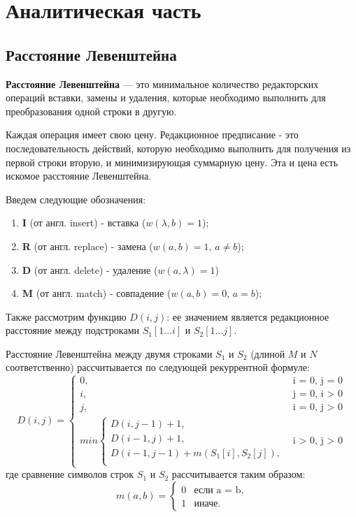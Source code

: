 \chapter{Аналитическая часть}
\section{Расстояние Левенштейна}

\textbf{Расстояние Левенштейна}\cite{levenshtein}  --- это минимальное количество редакторских операций вставки, замены и удаления, которые необходимо выполнить для преобразования одной строки в другую. 

Каждая операция имеет свою цену. Редакционное предписание - это последовательность действий, которую необходимо выполнить для получения из первой строки вторую, и минимизирующая суммарную цену. Эта  и цена есть искомое расстояние Левенштейна.

Введем следующие обозначения:
\begin{enumerate}[label=\arabic*)]
        \item \textbf{I} (от англ. insert) - вставка ($w(\lambda, b) = 1$);
        \item \textbf{R} (от англ. replace) - замена ($w(a, b) = 1$, $a \neq b$);
        \item \textbf{D} (от англ. delete) - удаление ($w(a, \lambda) = 1$)
        \item \textbf{M} (от англ. match) - совпадение ($w(a, b) = 0$, $a = b$);
\end{enumerate}

Также рассмотрим функцию $D(i, j)$: ее значением является
редакционное расстояние между подстроками $S_1[1...i]$ и $S_2[1...j]$.

Расстояние Левенштейна между двумя строками $S_{1}$ и $S_{2}$ (длиной $M$ и $N$ соответственно) рассчитывается по следующей рекуррентной формуле:
\begin{equation}
	\label{eq:L}
	D(i, j) =
	\begin{cases}
		0, &\text{i = 0, j = 0}\\
		i, &\text{j = 0, i > 0}\\
		j, &\text{i = 0, j > 0}\\
		min \begin{cases}
			D(i, j - 1) + 1,\\
			D(i - 1, j) + 1,\\
			D(i - 1, j - 1) +  m(S_{1}[i], S_{2}[j]), \\
		\end{cases}
		&\text{i > 0, j > 0}
	\end{cases}
\end{equation}
где сравнение символов строк $S_1$ и $S_2$ рассчитывается таким образом:
\begin{equation}
	\label{eq:m}
	m(a, b) = \begin{cases}
		0 &\text{если a = b,}\\
		1 &\text{иначе.}
	\end{cases}
\end{equation}

